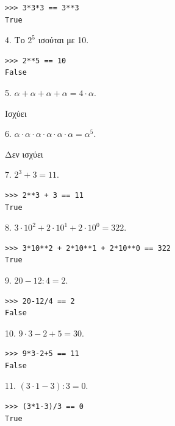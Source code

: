 \begin{lstlisting}
>>> 3*3*3 == 3**3
True 
\end{lstlisting}
\begin{exercise}
 4.     Το $2^5$ ισούται με 10.\end{exercise}

\begin{lstlisting}
>>> 2**5 == 10
False
\end{lstlisting}
\begin{exercise}
 5. $\alpha + \alpha + \alpha + \alpha = 4 \cdot \alpha$.\end{exercise}

Ισχύει
\begin{exercise}
 6. $\alpha\cdot \alpha\cdot \alpha\cdot \alpha\cdot \alpha\cdot \alpha = \alpha^5$.\end{exercise}

Δεν ισχύει
\begin{exercise}
 7. $2^3 + 3 = 11$.\end{exercise}

\begin{lstlisting}
>>> 2**3 + 3 == 11
True
\end{lstlisting}     
 \begin{exercise}
8. $3\cdot 10^2 + 2 \cdot 10^1 + 2 \cdot 10^0 = 322$.\end{exercise}

\begin{lstlisting}
>>> 3*10**2 + 2*10**1 + 2*10**0 == 322
True
\end{lstlisting}    
\begin{exercise}
 9.     $20 - 12 : 4 = 2$.\end{exercise}

\begin{lstlisting}
>>> 20-12/4 == 2
False
\end{lstlisting}    
\begin{exercise}
 10. $9 \cdot 3 - 2 + 5 = 30$.\end{exercise}

\begin{lstlisting}
>>> 9*3-2+5 == 11
False
\end{lstlisting}             
\begin{exercise}
 11. $(3 \cdot 1 - 3) : 3 = 0$.\end{exercise}

\begin{lstlisting}
>>> (3*1-3)/3 == 0
True
\end{lstlisting}  

